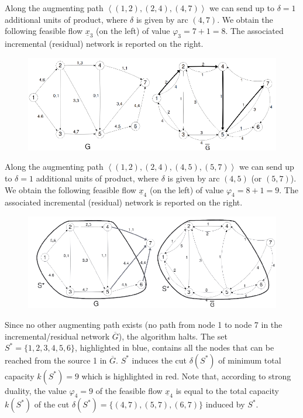 \documentclass[12pt, a4paper]{report}
\begin{document}
        Along the augmenting path $\left\langle (1, 2),(2, 4),(4, 7) \right\rangle $ we can send up to $\delta = 1$ additional units of product, where $\delta$ is given 
        by arc $(4, 7)$. We obtain the following feasible flow $\underline{x}_3$ (on the left) of value $\varphi_3 = 7 + 1 = 8$. The associated incremental (residual) 
        network is reported on the right.
        \begin{figure}[H]
            \centering
            \includegraphics[width=0.9\linewidth]{images/maxcut4.png}
        \end{figure}
        Along the augmenting path $\left\langle (1, 2),(2, 4),(4, 5),(5, 7) \right\rangle $ we can send up to $\delta = 1$ additional units of product, where $\delta$ is 
        given by arc $(4, 5)$ (or $(5, 7)$). We obtain the following feasible flow $\underline{x}_4$ (on the left) of value $\varphi_4 = 8 + 1 = 9$. The associated 
        incremental (residual) network is reported on the right.
        \begin{figure}[H]
            \centering
            \includegraphics[width=0.9\linewidth]{images/maxcut5.png}
        \end{figure}
        Since no other augmenting path exists (no path from node 1 to node 7 in the incremental/residual network $\overline{G}$), the algorithm halts. The set 
        $S^{*} = \{1, 2, 3, 4, 5, 6\}$, highlighted in blue, contains all the nodes that can be reached from the source 1 in $\overline{G}$. $S^{*}$ induces the 
        cut $\delta(S^{*})$ of minimum total capacity $k(S^{*}) = 9$ which is highlighted in red. Note that, according to strong duality, the value $\varphi_4=9$ of the 
        feasible flow $\underline{x}_4$ is equal to the total capacity $k(S^{*})$ of the cut $\delta(S^{*}) = \{(4, 7),(5, 7),(6, 7)\}$ induced by $S^{*}$.
\end{document}
